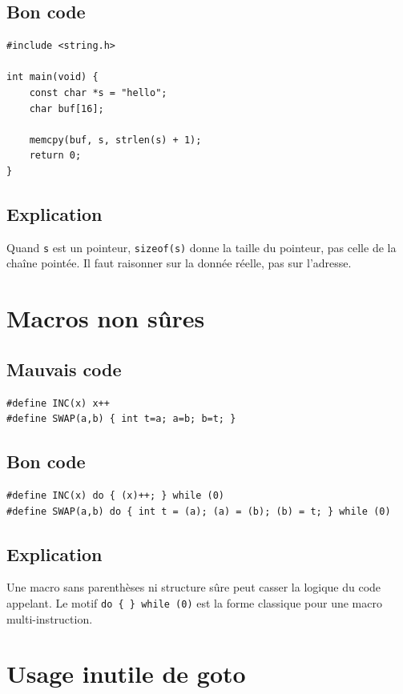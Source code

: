 \documentclass[a4paper,11pt]{report}
\begin{document}
\section{Bon code}
\begin{lstlisting}
#include <string.h>

int main(void) {
    const char *s = "hello";
    char buf[16];

    memcpy(buf, s, strlen(s) + 1);
    return 0;
}
\end{lstlisting}

\section{Explication}
Quand \texttt{s} est un pointeur, \texttt{sizeof(s)} donne la taille du pointeur, pas celle de la chaîne pointée.
Il faut raisonner sur la donnée réelle, pas sur l'adresse.

\chapter{Macros non sûres}

\section{Mauvais code}
\begin{lstlisting}
#define INC(x) x++
#define SWAP(a,b) { int t=a; a=b; b=t; }
\end{lstlisting}

\section{Bon code}
\begin{lstlisting}
#define INC(x) do { (x)++; } while (0)
#define SWAP(a,b) do { int t = (a); (a) = (b); (b) = t; } while (0)
\end{lstlisting}

\section{Explication}
Une macro sans parenthèses ni structure sûre peut casser la logique du code appelant.
Le motif \texttt{do \{ \} while (0)} est la forme classique pour une macro multi-instruction.

\chapter{Usage inutile de goto}
\end{document}
